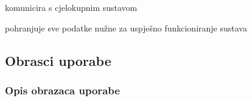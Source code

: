 \begin{packed_enum}
\begin{packed_enum}
				\end{packed_enum}
	
				\item  {}
				
					\begin{packed_enum}
						
						\item komunicira s cjelokupnim sustavom
						\item pohranjuje sve podatke nužne za uspješno funkcioniranje sustava
						
					\end{packed_enum}
			\end{packed_enum}
			
			\eject 
			
			
				
			\subsection{Obrasci uporabe}
								
				\subsubsection{Opis obrazaca uporabe}
				
					

